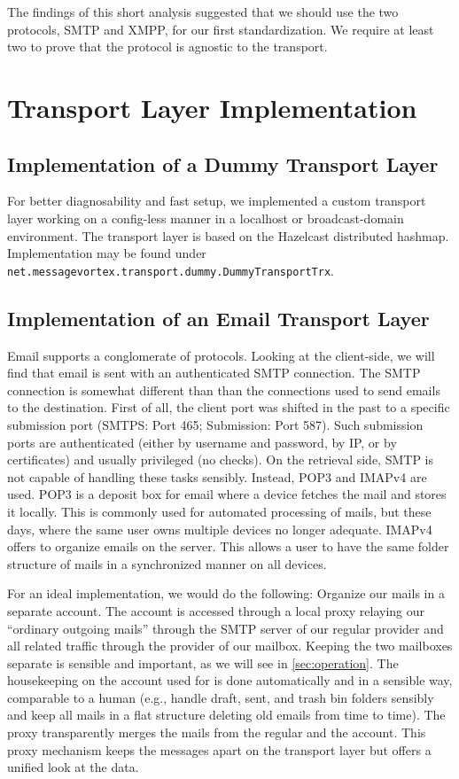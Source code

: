 The findings of this short analysis suggested that we should use the two protocols, SMTP and XMPP, for our first standardization. We require at least two to prove that the protocol is agnostic to the transport.

\chapter{Transport Layer Implementation}\label{sec:transportImplementation}
\section{Implementation of a Dummy Transport Layer}
For better diagnosability and fast setup, we implemented a custom transport layer working on a config-less manner in a localhost or broadcast-domain environment. The transport layer is based on the Hazelcast distributed hashmap. Implementation may be found under \lstinline[columns=fixed,basicstyle=\normalsize]{net.messagevortex.transport.dummy.DummyTransportTrx}. 

\section{Implementation of an Email Transport Layer}
Email supports a conglomerate of protocols. Looking at the client-side, we will find that email is sent with an authenticated SMTP connection. The SMTP connection is somewhat different than than the connections used to send emails to the destination. First of all, the client port was shifted in the past to a specific submission port (SMTPS: Port 465; Submission: Port 587). Such submission ports are authenticated (either by username and password, by IP, or by certificates) and usually privileged (no  checks). On the retrieval side, SMTP is not capable of handling these tasks sensibly. Instead, POP3 and IMAPv4 are used. POP3 is a deposit box for email where a device fetches the mail and stores it locally. This is commonly used for automated processing of mails, but these days, where the same user owns multiple devices no longer adequate. IMAPv4 offers to organize emails on the server. This allows a user to have the same folder structure of mails in a synchronized manner on all devices.

For an ideal implementation, we would do the following: Organize our \MessageVortex{} mails in a separate account. The account is accessed through a local proxy relaying our ``ordinary outgoing mails'' through the SMTP server of our regular provider and all \MessageVortex{} related traffic through the provider of our \MessageVortex{} mailbox. Keeping the two mailboxes separate is sensible and important, as we will see in \cref{sec:operation}. The housekeeping on the account used for \MessageVortex{} is done automatically and in a sensible way, comparable to a human (e.g., handle draft, sent, and trash bin folders sensibly and keep all mails in a flat structure deleting old emails from time to time). The proxy transparently merges the mails from the regular and the \MessageVortex{} account. This proxy mechanism keeps the messages apart on the transport layer but offers a unified look at the data.

